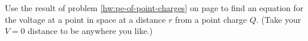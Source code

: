         Use the result of problem \ref{hw:pe-of-point-charges} on page 
        \pageref{hw:pe-of-point-charges} to find an equation
        for the voltage at a point in space at a distance $r$ from a
        point charge $Q$. (Take your $V=0$ distance to be anywhere you like.)
        \answercheck
